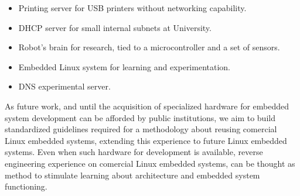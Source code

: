 \documentclass[conference]{IEEEtran}
\newcommand{\nota}[1]{}
\begin{document}
\begin{itemize}
\item Printing server for USB printers without networking capability. 
\item DHCP server for small internal subnets at University. 
\item Robot's brain for research, tied to a microcontroller and a set of sensors. 
\item Embedded Linux system for learning and experimentation.  
\item DNS experimental server.  
\end{itemize}

\nota{
Como trabajo futuro, se espera repetir la experiencia \cite{gpl}
en futuros sistemas Linux embebidos comerciales, para estandarizar
las tareas necesarias en una metodología, y hasta que la
posibilidad de adquirir hardware especializado para desarrollos
de sistemas Linux embebidos sea mucho mas accesible para
las instituciones publicas. En cuyo caso, la experiencia
de ingeniería inversa se puede mantener sobre productos comerciales,
como una manera de incentivar el aprendizaje del funcionamiento
y la arquitectura de los sistemas embebidos.
}

As future work, and until the acquisition of specialized
hardware for embedded system development can be afforded by public
institutions, we aim to build standardized guidelines required 
for a methodology about reusing comercial Linux embedded systems, 
extending this experience to future Linux embedded systems. Even 
when such hardware for development is available, reverse engineering 
experience on comercial Linux embedded systems, can be thought as 
method to stimulate learning about architecture and embedded system
functioning. 

\end{document}
